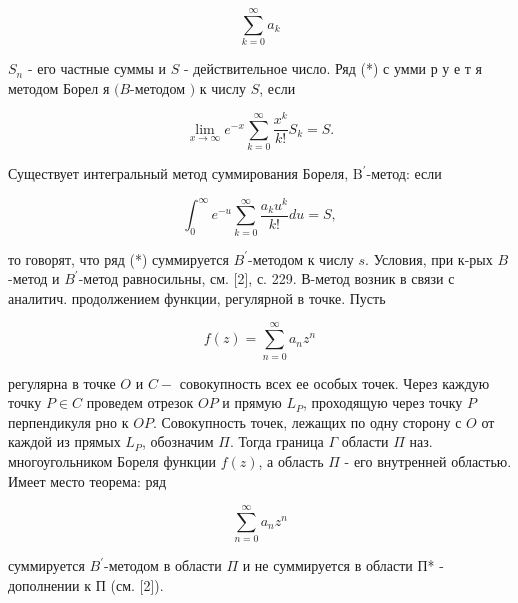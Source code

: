 \documentclass[10pt]{article}
\begin{document}
\[

\sum_{k=0}^{\infty} a_{k}

\]



$S_{n}$ - его частные суммы и $S$ - действительное число. Ряд (*) с умми р у е т я методом Борел я $(B$-методом $)$ к числу $S$, если



\[

\lim _{x \rightarrow \infty} e^{-x} \sum_{k=0}^{\infty} \frac{x^{k}}{k !} S_{k}=S .

\]



Существует интегральный метод суммирования Бореля, $\mathrm{B}^{\prime}$-метод: если



\[

\int_{0}^{\infty} e^{-u} \sum_{k=0}^{\infty} \frac{a_{k} u^{k}}{k !} d u=S,

\]



то говорят, что ряд (*) суммируется $B^{\prime}$-методом к числу $s$. Условия, при к-рых $B$-метод и $B^{\prime}$-метод равносильны, см. [2], с. 229. В-метод возник в связи с аналитич. продолжением функции, регулярной в точке. Пусть



\[

f(z)=\sum_{n=0}^{\infty} a_{n} z^{n}

\]



регулярна в точке $O$ и $C-$ совокупность всех ее особых точек. Через каждую точку $P \in C$ проведем отрезок $O P$ и прямую $L_{P}$, проходящую через точку $P$ перпендикуля рно к $O P$. Совокупность точек, лежащих по одну сторону с $O$ от каждой из прямых $L_{P}$, обозначим $\Pi$. Тогда граница $\Gamma$ области $\Pi$ наз. многоугольником Бореля функции $f(z)$, а область $\Pi$ - его внутренней областью. Имеет место теорема: ряд



\[

\sum_{n=0}^{\infty} a_{n} z^{n}

\]



суммируется $B^{\prime}$-методом в области $\Pi$ и не суммируется в области П* - дополнении к П (см. [2]).
\end{document}
